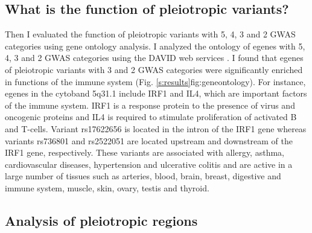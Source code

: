 \subsection*{What is the function of pleiotropic variants?}

Then I evaluated the function of pleiotropic variants with 5, 4, 3 and 2 GWAS categories using gene ontology analysis.
%
I analyzed the ontology of egenes with 5, 4, 3 and 2 GWAS categories using the DAVID web services \citep{2008.Lempicki.Huang,2008.Lempicki.Huang.NucleicAcidsResearch}.
%
I found that egenes of pleiotropic variants with 3 and 2 GWAS categories were significantly enriched in functions of the immune system (Fig. \ref{s:results}{fig:geneontology}).
For instance, egenes in the cytoband 5q31.1 include IRF1 and IL4, which are important factors of the immune system.
%
IRF1 is a response protein to the presence of virus and oncogenic proteins and IL4 is required to stimulate proliferation of activated B and T-cells.
%
Variant rs17622656 is located in the intron of the IRF1 gene whereas variants rs736801 and rs2522051 are located upstream and downstream of the IRF1 gene, respectively.
%
These variants are associated with allergy, asthma, cardiovascular diseases, hypertension and ulcerative colitis and are active in a large number of tissues such as arteries, blood, brain, breast, digestive and immune system, muscle, skin, ovary, testis and thyroid.


%

\subsection*{Analysis of pleiotropic regions}

